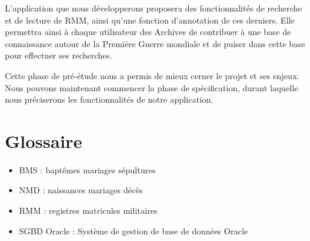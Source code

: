 \documentclass[a4paper]{article}
\begin{document}
L'application que nous d\'evelopperons proposera des fonctionnalit\'es de recherche et de lecture de RMM, ainsi qu'une fonction d'annotation de ces derniers. Elle permettra ainsi \`a chaque utilisateur des Archives de contribuer \`a une base de connaissance autour de la Premi\`ere Guerre mondiale et de puiser dans cette base pour effectuer ses recherches.

Cette phase de pr\'e-\'etude nous a permis de mieux cerner le projet et ses enjeux. Nous pouvons maintenant commencer la phase de sp\'ecification, durant laquelle nous pr\'eciserons les fonctionnalit\'es de notre application.


\newpage
\section{Glossaire}
\label{sec:glossaire}
\begin{itemize}
\item BMS : bapt\^emes mariages s\'epultures
\item NMD : naissances mariages d\'ec\`es
\item RMM : registres matricules militaires
\item SGBD Oracle : Syst\`eme de gestion de base de donn\'ees Oracle
\end{itemize}


\newpage
\end{document}
